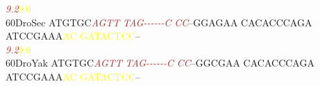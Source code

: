 \documentclass[11pt,twoside,reqno,a4paper]{article}
\begin{document}
{\hspace*{4\charwidth}\hspace*{7\charwidth}\hspace*{6\charwidth}\textit{\textcolor{brown}{9.2}}\hspace*{1\charwidth}\hspace*{1\charwidth}\hspace*{1\charwidth}\hspace*{1\charwidth}\hspace*{39\charwidth}\textcolor{yellow}{9.0}\hspace*{1\charwidth}\hspace*{1\charwidth}\\
60\hspace*{2\charwidth}DroSec	ATGTGC\textit{\textcolor{brown}{A}}\textit{\textcolor{brown}{G}}\textit{\textcolor{brown}{T}}\textit{\textcolor{brown}{T}}	\textit{\textcolor{brown}{T}}\textit{\textcolor{brown}{A}}\textit{\textcolor{brown}{G}}\textit{\textcolor{brown}{-}}\textit{\textcolor{brown}{-}}\textit{\textcolor{brown}{-}}\textit{\textcolor{brown}{-}}\textit{\textcolor{brown}{-}}\textit{\textcolor{brown}{-}}\textit{\textcolor{brown}{C}}	\textit{\textcolor{brown}{C}}\textit{\textcolor{brown}{C}}--GGAGAA	CACACCCAGA	ATCCGAAA\textcolor{yellow}{A}\textcolor{yellow}{C}	\textcolor{yellow}{G}\textcolor{yellow}{A}\textcolor{yellow}{T}\textcolor{yellow}{A}\textcolor{yellow}{C}\textcolor{yellow}{T}\textcolor{yellow}{C}\textcolor{yellow}{C}--	\\
\hspace*{4\charwidth}\hspace*{7\charwidth}\hspace*{6\charwidth}\textit{\textcolor{brown}{9.2}}\hspace*{1\charwidth}\hspace*{1\charwidth}\hspace*{1\charwidth}\hspace*{1\charwidth}\hspace*{39\charwidth}\textcolor{yellow}{9.0}\hspace*{1\charwidth}\hspace*{1\charwidth}\\
60\hspace*{2\charwidth}DroYak	ATGTGC\textit{\textcolor{brown}{A}}\textit{\textcolor{brown}{G}}\textit{\textcolor{brown}{T}}\textit{\textcolor{brown}{T}}	\textit{\textcolor{brown}{T}}\textit{\textcolor{brown}{A}}\textit{\textcolor{brown}{G}}\textit{\textcolor{brown}{-}}\textit{\textcolor{brown}{-}}\textit{\textcolor{brown}{-}}\textit{\textcolor{brown}{-}}\textit{\textcolor{brown}{-}}\textit{\textcolor{brown}{-}}\textit{\textcolor{brown}{C}}	\textit{\textcolor{brown}{C}}\textit{\textcolor{brown}{C}}--GGCGAA	CACACCCAGA	ATCCGAAA\textcolor{yellow}{A}\textcolor{yellow}{C}	\textcolor{yellow}{G}\textcolor{yellow}{A}\textcolor{yellow}{T}\textcolor{yellow}{A}\textcolor{yellow}{C}\textcolor{yellow}{T}\textcolor{yellow}{C}\textcolor{yellow}{C}--	\\
}
\end{document}

